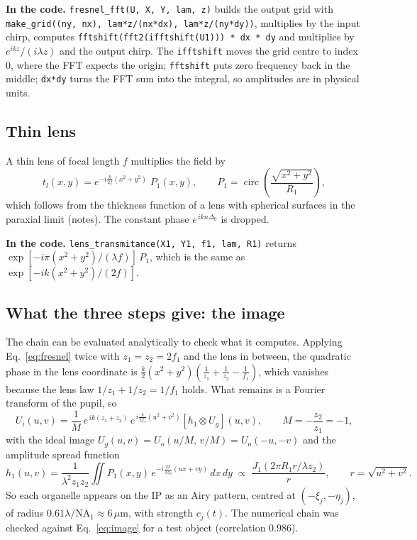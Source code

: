 \documentclass[11pt,a4paper]{article}
\newcommand{\um}{\,\mu\mathrm{m}}
\newcommand{\ee}{e}
\newcommand{\dd}{d}
\newcommand{\circf}{\operatorname{circ}}
\newcommand{\code}[1]{\texttt{\small #1}}
\newcommand{\incode}[1]{\par\smallskip\noindent\colorbox{black!6}{\parbox{\dimexpr\linewidth-2\fboxsep}{\small\textbf{In the code.} #1}}\par\smallskip}
\begin{document}
\incode{\code{fresnel\_fft(U, X, Y, lam, z)} builds the output grid with
\code{make\_grid((ny, nx), lam*z/(nx*dx), lam*z/(ny*dy))}, multiplies by the
input chirp, computes \code{fftshift(fft2(ifftshift(U1))) * dx * dy} and
multiplies by $\ee^{ikz}/(i\lambda z)$ and the output chirp. The
\code{ifftshift} moves the grid centre to index 0, where the FFT expects the
origin; \code{fftshift} puts zero frequency back in the middle; \code{dx*dy}
turns the FFT sum into the integral, so amplitudes are in physical units.}

\subsection{Thin lens}
\label{sec:lens}

A thin lens of focal length $f$ multiplies the field by
\begin{equation}
  t_l(x,y) = \ee^{-i\frac{k}{2f}(x^2+y^2)}\;P_1(x,y),
  \qquad P_1 = \circf\!\left(\frac{\sqrt{x^2+y^2}}{R_1}\right),
\end{equation}
which follows from the thickness function of a lens with spherical surfaces in
the paraxial limit (notes). The constant phase $\ee^{\,ikn\Delta_0}$ is dropped.

\incode{\code{lens\_transmitance(X1, Y1, f1, lam, R1)} returns
$\exp[-i\pi(x^2+y^2)/(\lambda f)]\,P_1$, which is the same as
$\exp[-ik(x^2+y^2)/(2f)]$.}

\subsection{What the three steps give: the image}
\label{sec:image}

The chain can be evaluated analytically to check what it computes. Applying
Eq.~\eqref{eq:fresnel} twice with $z_1 = z_2 = 2f_1$ and the lens in between,
the quadratic phase in the lens coordinate is
$\frac{k}{2}(x^2+y^2)\left(\frac{1}{z_1}+\frac{1}{z_2}-\frac{1}{f_1}\right)$,
which vanishes because the lens law $1/z_1 + 1/z_2 = 1/f_1$ holds. What
remains is a Fourier transform of the pupil, so
\begin{equation}
  U_i(u,v) = \frac{1}{M}\,\ee^{\,ik(z_1+z_2)}\,\ee^{\,i\frac{k}{2f_1}(u^2+v^2)}
  \left[h_1\otimes U_g\right](u,v),
  \qquad M = -\frac{z_2}{z_1} = -1,
  \label{eq:image}
\end{equation}
with the ideal image $U_g(u,v) = U_o(u/M,\,v/M) = U_o(-u,-v)$ and the
amplitude spread function
\begin{equation}
  h_1(u,v) = \frac{1}{\lambda^2 z_1z_2}\iint P_1(x,y)\,
  \ee^{-i\frac{2\pi}{\lambda z_2}(ux+vy)}\,\dd x\,\dd y
  \;\propto\; \frac{J_1(2\pi R_1 r/\lambda z_2)}{r},\qquad r = \sqrt{u^2+v^2}.
\end{equation}
So each organelle appears on the IP as an Airy pattern, centred at
$(-\xi_j,-\eta_j)$, of radius $0.61\lambda/\mathrm{NA}_1 \approx 6\um$, with
strength $c_j(t)$. The numerical chain was checked against
Eq.~\eqref{eq:image} for a test object (correlation $0.986$).
\end{document}
